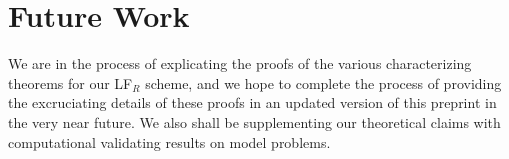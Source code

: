 \documentclass{amsart}
\theoremstyle{thmstyleone}%
\theoremstyle{thmstyletwo}%
\theoremstyle{thmstylethree}%
\begin{document}
 \section{Future Work}
 We are in the process of explicating the proofs of the various characterizing theorems for our LF$_R$ scheme, and we hope to complete the process of providing the excruciating details of these proofs in an updated version of this preprint in the very near future. We also shall be supplementing our theoretical claims with computational validating results on model problems.
 
 \printbibliography
\end{document}
